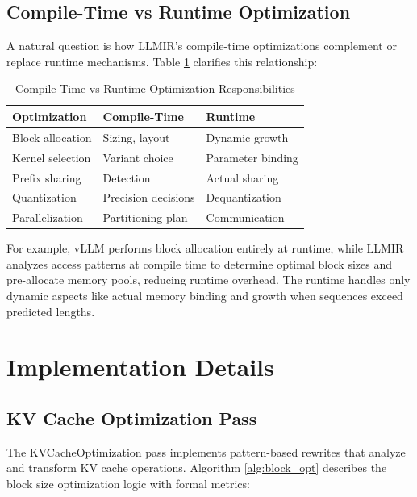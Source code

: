 \documentclass[conference]{IEEEtran}
\begin{document}
\subsection{Compile-Time vs Runtime Optimization}

A natural question is how LLMIR's compile-time optimizations complement or replace runtime mechanisms. Table \ref{tab:compile_runtime} clarifies this relationship:

\begin{table}[htbp]
\caption{Compile-Time vs Runtime Optimization Responsibilities}
\begin{center}
\begin{tabular}{|p{2.5cm}|p{2.2cm}|p{2.2cm}|}
\hline
\textbf{Optimization} & \textbf{Compile-Time} & \textbf{Runtime} \\
\hline
Block allocation & Sizing, layout & Dynamic growth \\
\hline
Kernel selection & Variant choice & Parameter binding \\
\hline
Prefix sharing & Detection & Actual sharing \\
\hline
Quantization & Precision decisions & Dequantization \\
\hline
Parallelization & Partitioning plan & Communication \\
\hline
\end{tabular}
\label{tab:compile_runtime}
\end{center}
\end{table}

For example, vLLM performs block allocation entirely at runtime, while LLMIR analyzes access patterns at compile time to determine optimal block sizes and pre-allocate memory pools, reducing runtime overhead. The runtime handles only dynamic aspects like actual memory binding and growth when sequences exceed predicted lengths.

\section{Implementation Details}

\subsection{KV Cache Optimization Pass}

The KVCacheOptimization pass implements pattern-based rewrites that analyze and transform KV cache operations. Algorithm \ref{alg:block_opt} describes the block size optimization logic with formal metrics:
\end{document}
